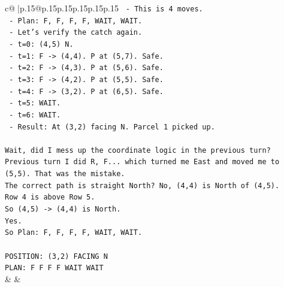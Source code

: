 \documentclass{article}
\begin{document}
{\begin{supertabular}{c@{$\;$}|p{.15\linewidth}@{}p{.15\linewidth}p{.15\linewidth}p{.15\linewidth}p{.15\linewidth}p{.15\linewidth}}
{{{\texttt{         {-} This is 4 moves.} \\
\texttt{         {-} Plan: F, F, F, F, WAIT, WAIT.} \\
\texttt{         {-} Let's verify the catch again.} \\
\texttt{         {-} t=0: (4,5) N.} \\
\texttt{         {-} t=1: F {-}> (4,4). P at (5,7). Safe.} \\
\texttt{         {-} t=2: F {-}> (4,3). P at (5,6). Safe.} \\
\texttt{         {-} t=3: F {-}> (4,2). P at (5,5). Safe.} \\
\texttt{         {-} t=4: F {-}> (3,2). P at (6,5). Safe.} \\
\texttt{         {-} t=5: WAIT.} \\
\texttt{         {-} t=6: WAIT.} \\
\texttt{         {-} Result: At (3,2) facing N. Parcel 1 picked up.} \\
\\ 
\texttt{Wait, did I mess up the coordinate logic in the previous turn?} \\
\texttt{Previous turn I did R, F... which turned me East and moved me to (5,5). That was the mistake.} \\
\texttt{The correct path is straight North? No, (4,4) is North of (4,5).} \\
\texttt{Row 4 is above Row 5.} \\
\texttt{So (4,5) {-}> (4,4) is North.} \\
\texttt{Yes.} \\
\texttt{So Plan: F, F, F, F, WAIT, WAIT.} \\
\\ 
\texttt{POSITION: (3,2) FACING N} \\
\texttt{PLAN: F F F F WAIT WAIT} \\
            }
        }
    }
    & & \\ \\


\end{supertabular}}
\end{document}
